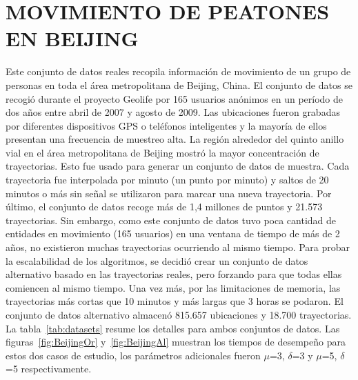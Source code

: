 \section{MOVIMIENTO DE PEATONES EN BEIJING}

Este conjunto de datos reales recopila información de movimiento de un grupo de 
personas en toda
el área metropolitana de Beijing, China\cite{GeoLife}. El conjunto de datos se 
recogió durante el proyecto Geolife por 165 usuarios anónimos en un período de 
dos años entre abril de 2007 y agosto de 2009. Las ubicaciones fueron grabadas 
por diferentes dispositivos GPS o teléfonos inteligentes y la mayoría de ellos 
presentan una frecuencia de muestreo alta. 
La región alrededor del quinto anillo vial en el área metropolitana de Beijing 
mostró la 
mayor concentración de trayectorias. Esto fue usado para generar un conjunto de 
datos de muestra. Cada trayectoria 
fue interpolada por minuto (un punto por minuto) y saltos de 20 minutos o más 
sin señal se utilizaron para marcar una nueva trayectoria. Por último, el 
conjunto de datos recoge más 
de 1,4 millones de puntos y 21.573 trayectorias. Sin embargo, como este conjunto 
de datos tuvo poca cantidad de
entidades en movimiento (165 usuarios) en una ventana de tiempo de más de 2 
años, no existieron muchas trayectorias ocurriendo al mismo tiempo. Para probar
la escalabilidad de los algoritmos, se decidió crear un conjunto de datos alternativo basado en las 
trayectorias reales, pero forzando para que todas ellas comiencen al mismo 
tiempo. Una 
vez más, por las limitaciones de memoria, las trayectorias más cortas que 10 
minutos y más largas que 3 horas se podaron. El conjunto de datos alternativo 
almacenó 815.657 
ubicaciones y 18.700 trayectorias. La tabla~\ref{tab:datasets} resume los 
detalles para ambos conjuntos de datos. Las figuras~\ref{fig:BeijingOr} 
y~\ref{fig:BeijingAl} muestran los tiempos de desempeño para estos dos casos de 
estudio, los parámetros adicionales fueron $\mu$=3, $\delta$=3 y  $\mu$=5, 
$\delta$=5 respectivamente.


